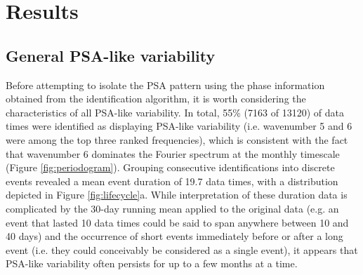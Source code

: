 \section{Results}

\subsection{General PSA-like variability}

Before attempting to isolate the PSA pattern using the phase information obtained from the identification algorithm, it is worth considering the characteristics of all PSA-like variability. In total, 55\% (7163 of 13120) of data times were identified as displaying PSA-like variability (i.e. wavenumber 5 and 6 were among the top three ranked frequencies), which is consistent with the fact that wavenumber 6 dominates the Fourier spectrum at the monthly timescale (Figure \ref{fig:periodogram}). Grouping consecutive identifications into discrete events revealed a mean event duration of 19.7 data times, with a distribution depicted in Figure \ref{fig:lifecycle}a. While interpretation of these duration data is complicated by the 30-day running mean applied to the original data (e.g. an event that lasted 10 data times could be said to span anywhere between 10 and 40 days) and the occurrence of short events immediately before or after a long event (i.e. they could conceivably be considered as a single event), it appears that PSA-like variability often persists for up to a few months at a time.     

